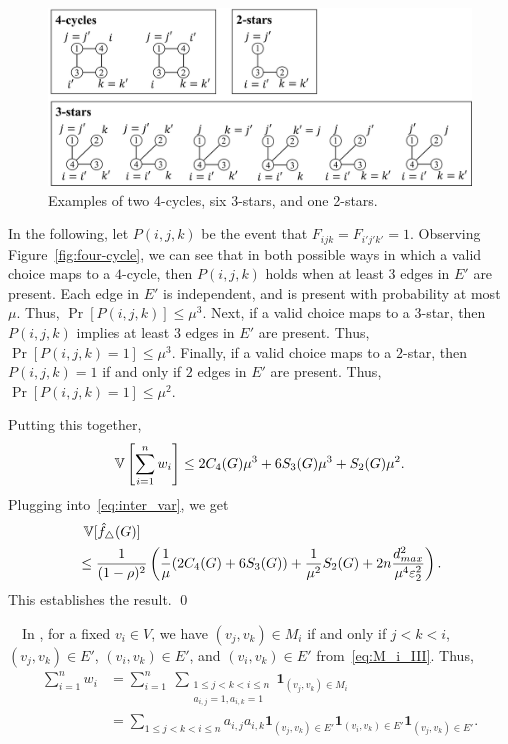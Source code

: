 {\begin{figure}[t]
  \centering
  \includegraphics[width=0.99\linewidth]{fig/associated_subgraphs.pdf}
  \vspace{-4mm}
  \caption{Examples of two 4-cycles, six 3-stars, and one 2-stars.}
  \label{fig:associated_subgraphs}
\end{figure}

In the following, let $P(i,j,k)$ be the event that $F_{ijk} = F_{i'j'k'} = 1$.
Observing Figure~\ref{fig:four-cycle}, we can see that in both possible ways in
which a valid choice maps to a $4$-cycle, then $P(i,j,k)$ holds when at least $3$
edges in $E'$ are present. Each edge in $E'$ is independent,
and is present with probability at most $\mu$. Thus, $\Pr[P(i,j,k)] \leq \mu^3$.
Next, if a valid choice maps to a $3$-star, then $P(i,j,k)$ implies at least $3$
edges in $E'$ are present. Thus, $\Pr[P(i,j,k) = 1] \leq \mu^3$.
Finally, if a valid choice maps to a $2$-star, then $P(i,j,k) = 1$
if and only if $2$ edges in $E'$ are present. Thus, $\Pr[P(i,j,k) = 1] \leq \mu^2$.

Putting this together,
\[
  \operatorname{\mathbb{V}}\left[\sum_{i=1}^n w_i\right] \leq 2 C_4(G) \mu^3 + 6 S_3(G) \mu^3 + S_2(G) \mu^2.
\]
Plugging into~\eqref{eq:inter_var}, we get
\begin{align*}
  &\;\operatorname{\mathbb{V}}[\hat{f}_\triangle(G)] \\
  &\leq \frac{1}{(1-\rho)^2} \left(\frac{1}{\mu}(2C_4(G) + 6S_3(G)) + \frac{1}{\mu^2} S_2(G) + 2n\frac{d_{max}^2}{\mu^4\varepsilon_2^2}\right).
\end{align*}
This establishes the result. \qed

\smallskip
{}~~In \AlgThree{}, for a fixed
$v_i \in V$, we have $(v_j, v_k) \in M_i$ if and only if
$j < k < i$, $(v_j, v_k) \in E'$, $(v_i, v_k) \in E'$, and $(v_i, v_k) \in E'$
from~\eqref{eq:M_i_III}. Thus,
\begin{align*}
\sum_{i=1}^n w_i &= \sum_{i=1}^n~\sum_{\substack{1 \leq j < k < i \leq n \\
a_{i,j} = 1, a_{i,k} = 1}} \textbf{1}_{(v_j, v_k) \in M_i} \\
&= \sum_{1 \leq j < k < i \leq n}
a_{i,j}a_{i,k}\textbf{1}_{(v_j, v_k) \in E'} \textbf{1}_{(v_i, v_k) \in E'}\textbf{1}_{(v_j, v_k) \in E'}.
\end{align*}

}
